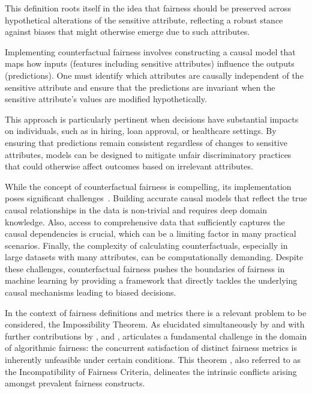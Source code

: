 This definition roots itself in the idea that fairness should be preserved across hypothetical alterations of the sensitive attribute, reflecting a robust stance against biases that might otherwise emerge due to such attributes.

Implementing counterfactual fairness involves constructing a causal model that maps how inputs (features including sensitive attributes) influence the outputs (predictions). One must identify which attributes are causally independent of the sensitive attribute and ensure that the predictions are invariant when the sensitive attribute's values are modified hypothetically.

This approach is particularly pertinent when decisions have substantial impacts on individuals, such as in hiring, loan approval, or healthcare settings. By ensuring that predictions remain consistent regardless of changes to sensitive attributes, models can be designed to mitigate unfair discriminatory practices that could otherwise affect outcomes based on irrelevant attributes.

While the concept of counterfactual fairness is compelling, its implementation poses significant challenges~\cite{Kasirzadeh2021}. Building accurate causal models that reflect the true causal relationships in the data is non-trivial and requires deep domain knowledge. Also, access to comprehensive data that sufficiently captures the causal dependencies is crucial, which can be a limiting factor in many practical scenarios. Finally, the complexity of calculating counterfactuals, especially in large datasets with many attributes, can be computationally demanding. Despite these challenges, counterfactual fairness pushes the boundaries of fairness in machine learning by providing a framework that directly tackles the underlying causal mechanisms leading to biased decisions. 

In the context of fairness definitions and metrics there is a relevant problem to be considered, the Impossibility Theorem. As elucidated simultaneously by \cite{Kleinberg2017} and \cite{Chouldechova2017} with further contributions by \cite{Saravanakumar2020}, \cite{Bell2023} and \cite{Beigang2023}, articulates a fundamental challenge in the domain of algorithmic fairness: the concurrent satisfaction of distinct fairness metrics is inherently unfeasible under certain conditions. This theorem , also referred to as the Incompatibility of Fairness Criteria, delineates the intrinsic conflicts arising amongst prevalent fairness constructs.

